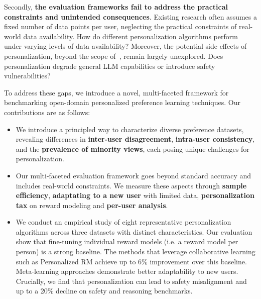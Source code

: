 Secondly, \textbf{the evaluation frameworks fail to address the practical constraints and unintended consequences}. Existing research often assumes a fixed number of data points per user, neglecting the practical constraints of real-world data availability. How do different personalization algorithms perform under varying levels of data availability? 
Moreover, the potential side effects of personalization, beyond the scope of~\cite{kirk_benefits_2024}, remain largely unexplored. Does personalization degrade general LLM capabilities or introduce safety vulnerabilities?









To address these gaps, we introduce a novel, multi-faceted framework for benchmarking open-domain personalized preference learning techniques. Our contributions are as follows:

\begin{itemize}[leftmargin=*, noitemsep,topsep=1pt]
    \itemsep 0em
    \item We introduce a principled way to characterize diverse preference datasets, revealing differences in \textbf{inter-user disagreement}, \textbf{intra-user consistency}, and the \textbf{prevalence of minority views}, each posing unique challenges for personalization.

    \item Our multi-faceted evaluation framework goes beyond standard accuracy and includes real-world constraints. We measure these aspects through \textbf{sample efficiency}, \textbf{adaptating to a new user} with limited data, \textbf{personalization tax} on reward modeling and \textbf{per-user analysis}. 

    \item We conduct an empirical study of eight representative personalization algorithms across three datasets with distinct characteristics. Our evaluation show that fine-tuning individual reward models (i.e. a reward model per person) is a strong baseline. The methods that leverage collaborative learning such as Personalized RM achieve up to 6\% improvement over this baseline. Meta-learning approaches demonstrate better adaptability to new users. Crucially, we find that personalization can lead to safety misalignment and up to a %
    20\% decline on safety and reasoning benchmarks.
\end{itemize}






















